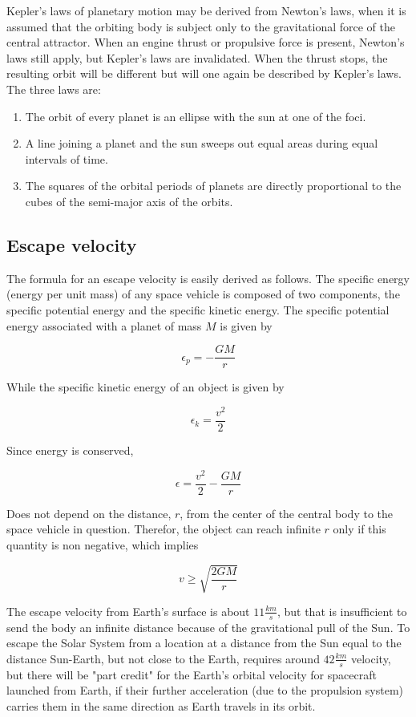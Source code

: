 \documentclass[12pt]{article}
\begin{document}
Kepler's laws of planetary motion may be derived from Newton's laws, when it is
assumed that the orbiting body is subject only to the gravitational force of
the central attractor. When an engine thrust or propulsive force is present,
Newton's laws still apply, but Kepler's laws are invalidated. When the thrust
stops, the resulting orbit will be different but will one again be described by
Kepler's laws. The three laws are:

\begin{enumerate}
  \item The orbit of every planet is an ellipse with the sun at one of the
    foci.
  \item A line joining a planet and the sun sweeps out equal areas during equal
    intervals of time.
  \item The squares of the orbital periods of planets are directly proportional
    to the cubes of the semi-major axis of the orbits.
\end{enumerate}
\subsection{Escape velocity}

The formula for an escape velocity is easily derived as follows. The specific
energy (energy per unit mass) of any space vehicle is composed of two
components, the specific potential energy and the specific kinetic energy. The
specific potential energy associated with a planet of mass \(M\) is given by

\[\epsilon_{p}=-\frac{GM}{r}\]

While the specific kinetic energy of an object is given by

\[\epsilon_{k}=\frac{v^{2}}{2}\]

Since energy is conserved,

\[\epsilon=\frac{v^{2}}{2}-\frac{GM}{r}\]

Does not depend on the distance, \(r\), from the center of the central body to
the space vehicle in question. Therefor, the object can reach infinite \(r\)
only if this quantity is non negative, which implies

\[v\geq\sqrt{\frac{2GM}{r}}\]

The escape velocity from Earth's surface is about \(11\frac{km}{s}\), but that
is insufficient to send the body an infinite distance because of the
gravitational pull of the Sun. To escape the Solar System from a location at a
distance from the Sun equal to the distance Sun-Earth, but not close to the
Earth, requires around \(42\frac{km}{s}\) velocity, but there will be "part
credit" for the Earth's orbital velocity for spacecraft launched from Earth, if
their further acceleration (due to the propulsion system) carries them in the
same direction as Earth travels in its orbit.
\end{document}
